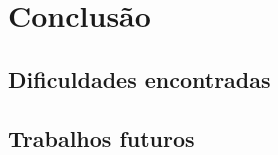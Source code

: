 \chapter{Conclusão}
\label{conclusoes}

\section{Dificuldades encontradas}

\section{Trabalhos futuros}



